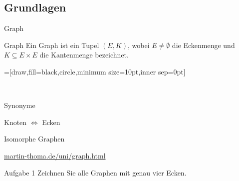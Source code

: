 \subsection{Grundlagen}
\begin{frame}{Graph}
\begin{block}{Graph}
Ein Graph ist ein Tupel $(E, K)$, wobei $E \neq \emptyset$ die Eckenmenge und 
$K \subseteq E \times E$ die 
Kantenmenge bezeichnet.
\end{block}
\pause
{}=[draw,fill=black,circle,minimum size=10pt,inner sep=0pt]

\begin{gallery}
    \\
\end{gallery}
\end{frame}

\begin{frame}{Synonyme}

\begin{center}
\Huge{Knoten $\Leftrightarrow$ Ecken}
\end{center}

\end{frame}

\begin{frame}{Isomorphe Graphen}
\begin{center}
\href{http://www.martin-thoma.de/uni/graph.html}{martin-thoma.de/uni/graph.html}
\end{center}
\end{frame}

\begin{frame}{Aufgabe 1}
Zeichnen Sie alle Graphen mit genau vier Ecken.

\end{frame}


